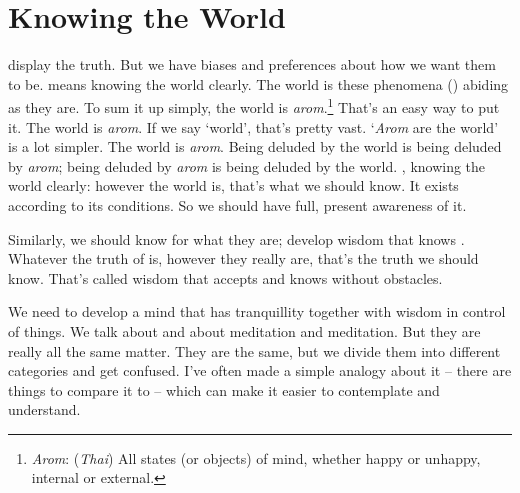 

\chapter{Knowing the World}

 display the truth. But we have biases and preferences about how we want them to be.  means knowing the world clearly. The world is these phenomena () abiding as they are. To sum it up simply, the world is \textit{arom}.\footnote{\textit{Arom}: (\textit{Thai}) All states (or objects) of mind, whether happy or unhappy, internal or external.} That's an easy way to put it. The world is \textit{arom}. If we say `world', that's pretty vast. `\textit{Arom} are the world' is a lot simpler. The world is \textit{arom}. Being deluded by the world is being deluded by \textit{arom}; being deluded by \textit{arom} is being deluded by the world. , knowing the world clearly: however the world is, that's what we should know. It exists according to its conditions. So we should have full, present awareness of it.

Similarly, we should know  for what they are; develop wisdom that knows . Whatever the truth of  is, however they really are, that's the truth we should know. That's called wisdom that accepts and knows without obstacles.

We need to develop a mind that has tranquillity together with wisdom in control of things. We talk about    and about  meditation and  meditation. But they are really all the same matter. They are the same, but we divide them into different categories and get confused. I've often made a simple analogy about it -- there are things to compare it to -- which can make it easier to contemplate and understand.

